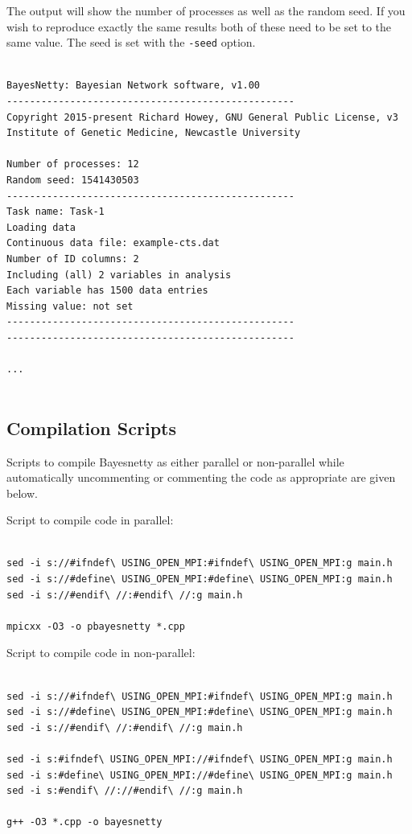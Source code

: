 \documentclass[a4paper,12pt]{article}
\newcommand{\code}[1]{{\footnotesize{{\tt #1}}}}
\begin{document}
The output will show the number of processes as well as the random seed. If you wish to reproduce exactly the same results both of these need to be set to the same value. The seed is set with the \code{-seed} option. 
\vspace{0.35cm} \begin{lstlisting}

BayesNetty: Bayesian Network software, v1.00
--------------------------------------------------
Copyright 2015-present Richard Howey, GNU General Public License, v3
Institute of Genetic Medicine, Newcastle University

Number of processes: 12
Random seed: 1541430503
--------------------------------------------------
Task name: Task-1
Loading data
Continuous data file: example-cts.dat
Number of ID columns: 2
Including (all) 2 variables in analysis
Each variable has 1500 data entries
Missing value: not set
--------------------------------------------------
--------------------------------------------------

...


\end{lstlisting} \vspace{0.35cm}\subsection{Compilation Scripts}
\label{compile-parallel-code}

Scripts to compile Bayesnetty as either parallel or non-parallel while automatically uncommenting or commenting the code as appropriate are given below. 

Script to compile code in parallel: 
\vspace{0.35cm} \begin{lstlisting}

sed -i s://#ifndef\ USING_OPEN_MPI:#ifndef\ USING_OPEN_MPI:g main.h
sed -i s://#define\ USING_OPEN_MPI:#define\ USING_OPEN_MPI:g main.h
sed -i s://#endif\ //:#endif\ //:g main.h

mpicxx -O3 -o pbayesnetty *.cpp

\end{lstlisting} \vspace{0.35cm}
Script to compile code in non-parallel: 
\vspace{0.35cm} \begin{lstlisting}

sed -i s://#ifndef\ USING_OPEN_MPI:#ifndef\ USING_OPEN_MPI:g main.h
sed -i s://#define\ USING_OPEN_MPI:#define\ USING_OPEN_MPI:g main.h
sed -i s://#endif\ //:#endif\ //:g main.h

sed -i s:#ifndef\ USING_OPEN_MPI://#ifndef\ USING_OPEN_MPI:g main.h
sed -i s:#define\ USING_OPEN_MPI://#define\ USING_OPEN_MPI:g main.h
sed -i s:#endif\ //://#endif\ //:g main.h

g++ -O3 *.cpp -o bayesnetty

\end{lstlisting} \vspace{0.35cm}
\end{document}
